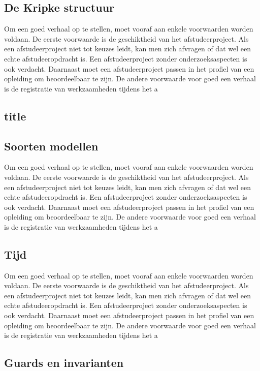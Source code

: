 \subsection{De Kripke structuur}

Om een goed verhaal op te stellen, moet vooraf aan enkele voorwaarden
worden voldaan. De eerste voorwaarde is de geschiktheid van het
afstudeerproject. Als een afstudeerproject niet tot keuzes leidt, kan
men zich afvragen of dat wel een echte afstudeeropdracht is. Een
afstudeerproject zonder onderzoeksaspecten is ook verdacht. Daarnaast
moet een afstudeerproject passen in het profiel van een opleiding om
beoordeelbaar te zijn. De andere voorwaarde voor goed een verhaal is
de registratie van werkzaamheden tijdens het a

\subsection{title}


\subsection{Soorten modellen}

Om een goed verhaal op te stellen, moet vooraf aan enkele voorwaarden
worden voldaan. De eerste voorwaarde is de geschiktheid van het
afstudeerproject. Als een afstudeerproject niet tot keuzes leidt, kan
men zich afvragen of dat wel een echte afstudeeropdracht is. Een
afstudeerproject zonder onderzoeksaspecten is ook verdacht. Daarnaast
moet een afstudeerproject passen in het profiel van een opleiding om
beoordeelbaar te zijn. De andere voorwaarde voor goed een verhaal is
de registratie van werkzaamheden tijdens het a
\subsection{Tijd}

Om een goed verhaal op te stellen, moet vooraf aan enkele voorwaarden
worden voldaan. De eerste voorwaarde is de geschiktheid van het
afstudeerproject. Als een afstudeerproject niet tot keuzes leidt, kan
men zich afvragen of dat wel een echte afstudeeropdracht is. Een
afstudeerproject zonder onderzoeksaspecten is ook verdacht. Daarnaast
moet een afstudeerproject passen in het profiel van een opleiding om
beoordeelbaar te zijn. De andere voorwaarde voor goed een verhaal is
de registratie van werkzaamheden tijdens het a
\subsection{Guards en invarianten}

